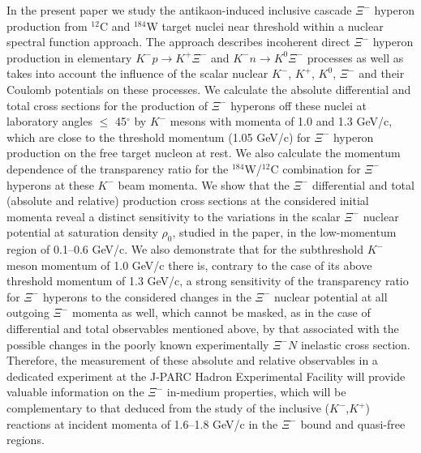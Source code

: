 \documentclass[12pt]{article}
\begin{document}
\hspace{0.5cm} In the present paper we study the antikaon-induced inclusive cascade $\Xi^-$ hyperon
production from $^{12}$C and $^{184}$W target nuclei near threshold within a nuclear spectral function
approach. The approach describes incoherent direct $\Xi^-$ hyperon production in elementary
${K^-}p \to {K^+}\Xi^-$ and ${K^-}n \to {K^0}\Xi^-$ processes as well as takes into account the influence
of the scalar nuclear $K^-$, $K^+$, $K^0$, $\Xi^-$ and their Coulomb potentials on these processes.
We calculate the absolute differential and total cross sections for the production of $\Xi^-$ hyperons
off these nuclei at laboratory angles $\le$ 45$^{\circ}$ by $K^-$ mesons with momenta of 1.0 and 1.3 GeV/c,
which are close to the threshold momentum (1.05 GeV/c) for $\Xi^-$ hyperon production on the free
target nucleon at rest. We also calculate the momentum dependence of the transparency ratio for the
$^{184}$W/$^{12}$C combination for $\Xi^-$ hyperons at these $K^-$ beam momenta.
We show that the $\Xi^-$ differential and total (absolute and relative) production cross sections
at the considered initial momenta reveal a distinct sensitivity to the variations
in the scalar $\Xi^-$ nuclear potential at saturation density $\rho_0$, studied in the paper,
in the low-momentum region of 0.1--0.6 GeV/c.
We also demonstrate that for the subthreshold $K^-$ meson momentum of 1.0 GeV/c there is, contrary to the
case of its above threshold momentum of 1.3 GeV/c, a strong sensitivity of the transparency ratio
for $\Xi^-$ hyperons to the considered changes in the $\Xi^-$ nuclear potential at all outgoing $\Xi^-$
momenta as well, which cannot be masked, as in the case of differential and total observables mentioned above,
by that associated with the possible changes in the poorly known experimentally ${\Xi^-}N$ inelastic cross section. Therefore, the measurement of these absolute and relative observables in a dedicated experiment at
the J-PARC Hadron Experimental Facility will provide valuable information on the $\Xi^-$ in-medium properties,
which will be complementary to that deduced from the study of the inclusive ($K^-$,$K^+$) reactions
at incident momenta of 1.6--1.8 GeV/c in the $\Xi^-$ bound and quasi-free regions.
\\
\\
\end{document}
